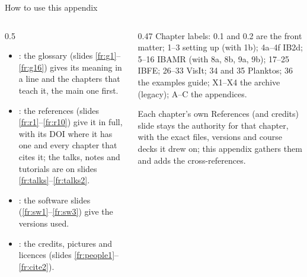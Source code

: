 \documentclass[aspectratio=169,11pt]{beamer}
\begin{document}
\begin{frame}{How to use this appendix}
\label{fr:use}
\begin{columns}[T,onlytextwidth]
\begin{column}{0.5\textwidth}
\small
\begin{itemize}\setlength{\itemsep}{3pt}
  \item {}: the glossary (slides \ref{fr:g1}--\ref{fr:g16}) gives its meaning in a line and the chapters that teach it, the main one first.
  \item {}: the references (slides \ref{fr:r1}--\ref{fr:r10}) give it in full, with its DOI where it has one and every chapter that cites it; the talks, notes and tutorials are on slides \ref{fr:talks}--\ref{fr:talks2}.
  \item {}: the software slides (\ref{fr:sw1}--\ref{fr:sw3}) give the versions used.
  \item {}: the credits, pictures and licences (slides \ref{fr:people1}--\ref{fr:cite2}).
\end{itemize}
\end{column}
\begin{column}{0.47\textwidth}
\small Chapter labels: 0.1 and 0.2 are the front matter; 1--3 setting up (with 1b); 4a--4f IB2d; 5--16 IBAMR (with 8a, 8b, 9a, 9b); 17--25 IBFE; 26--33 VisIt; 34 and 35 Planktos; 36 the examples guide; X1--X4 the archive (legacy); A--C the appendices.
\vspace{2mm}
\begin{punchbox}
\small Each chapter's own References (and credits) slide stays the authority for that chapter, with the exact files, versions and course decks it drew on; this appendix gathers them and adds the cross-references.
\end{punchbox}
\end{column}
\end{columns}
\end{frame}
\end{document}
